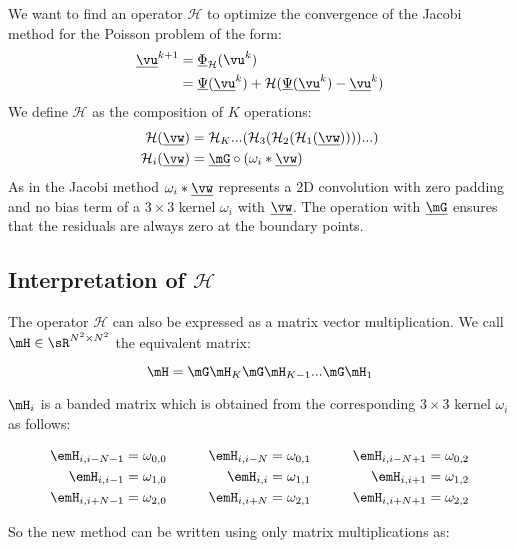 \documentclass{article} %
\begin{document}
We want to find an operator $\mathcal{H}$ to optimize the convergence of the Jacobi method for the Poisson problem of the form:
\begin{align*}
\underline{\vu}^{k+1} &=  \underline{\Phi}_{\mathcal{H}}(\vu^k) \\            &=\underline{\Psi}(\underline{\vu}^k) + \mathcal{H}(\underline{\Psi}(\underline{\vu}^k)-\underline{\vu}^k)
\end{align*}
We define $\mathcal{H}$ as the composition of $K$ operations:
\begin{align*}
    \mathcal{H}(\underline{\vw}) &= \mathcal{H}_K...(\mathcal{H}_3(\mathcal{H}_2(\mathcal{H}_1(\underline{\vw}))))...)\\
    \mathcal{H}_i(\underline{\vw}) &= \underline{\mG} \circ (\omega_i \ast \underline{\vw})
\end{align*}
As in the Jacobi method $\omega_i \ast \underline{\vw}$ represents a 2D convolution with zero padding and no bias term of a $3\times3$ kernel $\omega_i$ with $\underline{\vw}$. The operation with $\underline{\mG}$ ensures that the residuals are always zero at the boundary points.

\subsection{Interpretation of $\mathcal{H}$ }
The operator $\mathcal{H}$ can also be expressed as a matrix vector multiplication. We call $\mH \in \sR^{N^2 \times N^2}$ the equivalent matrix:

\begin{equation*}
    \mH = \mG\mH_K\mG\mH_{K-1}...\mG\mH_1
\end{equation*}

$\mH_i$ is a banded matrix which is obtained from the corresponding $3\times3$ kernel $\omega_i$ as follows:

\begin{alignat*}{3}
\emH_{i,i-N-1}  & = \omega_{0,0}  &\qquad \emH_{i,i-N} &  = \omega_{0,1}  &\qquad \emH_{i,i-N+1}  & = \omega_{0,2}\\
\emH_{i,i-1}  & = \omega_{1,0}  &  \emH_{i,i} & = \omega_{1,1} &  \emH_{i,i+1}  & = \omega_{1,2}\\
\emH_{i,i+N-1}  & = \omega_{2,0}  &  \emH_{i,i+N}  & = \omega_{2,1}  &  \emH_{i,i+N+1}  & = \omega_{2,2}
\end{alignat*}

So the new method can be written using only matrix multiplications as:
\end{document}
